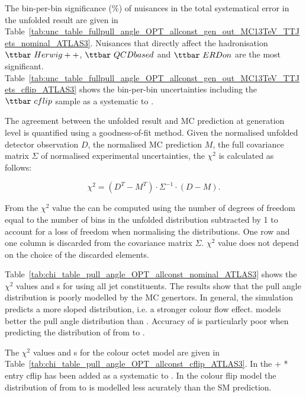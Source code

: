 The bin-per-bin significance (\%) of nuisances in the total systematical error in the unfolded result are given in Table~\ref{tab:unc_table_fullpull_angle_OPT_allconst_gen_out_MC13TeV_TTJets_nominal_ATLAS3}. Nuisances that directly affect the hadronisation $\ttbar\ Herwig++$, $\ttbar\ QCDbased$ and $\ttbar\ ERDon$ are the most significant. Table~\ref{tab:unc_table_fullpull_angle_OPT_allconst_gen_out_MC13TeV_TTJets_cflip_ATLAS3} shows the bin-per-bin uncertainties including the $\ttbar\ cflip$ sample as a systematic to \ttbar.

The agreement between the unfolded result and MC prediction at generation level is quantified using a goodness-of-fit method. Given the normalised unfolded detector observation $D$, the normalised MC prediction $M$, the full covariance matrix $\Sigma$ of normalised experimental uncertainties, the $\chi^{2}$ is calculated as follows:

\begin{equation}
  \chi^{2}=(D^{T}-M^{T})\cdot\Sigma^{-1}\cdot(D-M).
  \label{eq:chi2}
\end{equation}

From the $\chi^{2}$ value the \pval can be computed using the number of degrees of freedom equal to the number of bins in the unfolded distribution subtracted by 1 to account for a loss of freedom when normalising the distributions. One row and one column is discarded from the covariance matrix $\Sigma$. $\chi^{2}$ value does not depend on the choice of the discarded elements.

Table~\ref{tab:chi_table_pull_angle_OPT_allconst_nominal_ATLAS3} shows the $\chi^{2}$ values and \pval s for \pullangle using all jet constituents. The results show that the pull angle distribution is poorly modelled by the MC genertors. In general, the simulation predicts a more sloped distribution, i.e. a stronger colour flow effect. \HERWIGpp models better the pull angle distribution than . Accuracy of  is particularly poor when predicting the distribution of \pullangle from \scndleadingjet to \leadingjet.

The $\chi^{2}$ values and \pval s for the \PW colour octet model are given in Table~\ref{tab:chi_table_pull_angle_OPT_allconst_cflip_ATLAS3}. In the \POWHEG+ * entry \ttbar cflip has been added as a systematic to \ttbar. In the colour flip model the distribution of \pullangle from \leadingjet to \scndleadingjet is modelled less acurately than the SM prediction.
  

